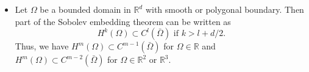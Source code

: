 \documentclass[oneside,a4paper,11pt]{report}
\begin{document}
\begin{itemize}
    \item Let $\Omega$ be a bounded domain in $\mathbb{R}^d$ with smooth or polygonal boundary. Then part of the Sobolev embedding theorem can be written as
    \begin{equation}
        H^k(\Omega) \subset C^l(\bar{\Omega}) \text{ if } k > l + d/2.
    \end{equation}
    Thus, we have $H^m(\Omega) \subset C^{m-1}(\bar{\Omega})$ for $\Omega \in \mathbb{R}$ and $H^m(\Omega) \subset C^{m-2}(\bar{\Omega})$ for $\Omega \in \mathbb{R}^2$ or $\mathbb{R}^3$.
\end{itemize}
\end{document}
